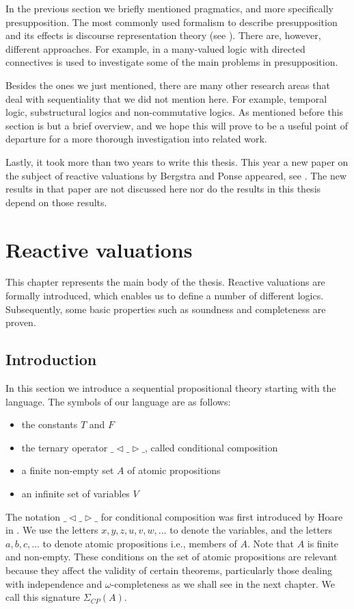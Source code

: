 \documentclass[a4paper,twoside,openright]{report}
\newcommand{\sig}{\ensuremath{\Sigma_{CP}(A)}}
\newcommand{\lef}{\ensuremath{\triangleleft}}
\newcommand{\rig}{\ensuremath{\triangleright}}
\begin{document}
In the previous section we briefly mentioned pragmatics, and more specifically presupposition. The most commonly used formalism to describe presupposition and its effects is discourse representation theory (see \cite{DHT}). There are, however, different approaches. For example, in \cite{kracht} a many-valued logic with directed connectives is used to investigate some of the main problems in presupposition.

Besides the ones we just mentioned, there are many other research areas that deal with sequentiality that we did not mention here. For example, temporal logic, substructural logics and non-commutative logics. As mentioned before this section is but a brief overview, and we hope this will prove to be a useful point of departure for a more thorough investigation into related work.

Lastly, it took more than two years to write this thesis. This year a new paper on the subject of reactive valuations by Bergstra and Ponse appeared, see \cite{future}. The new results in that paper are not discussed here nor do the results in this thesis depend on those results.



\chapter{Reactive valuations}

This chapter represents the main body of the thesis. Reactive valuations are formally introduced, which enables us to define a number of different logics. Subsequently, some basic properties such as soundness and completeness are proven. 

\section{Introduction}
In this section we introduce a sequential propositional theory starting with the language. The symbols of our language are as follows:
\begin{itemize}
\item the constants $T$ and $F$
\item the ternary operator $\_\lef\_\rig\_$, called conditional composition
\item a finite non-empty set $A$ of atomic propositions
\item an infinite set of variables $V$
\end{itemize}
The notation $\_\lef\_\rig\_$ for conditional composition was first introduced by Hoare in \cite{hoare}. We use the letters $x, y, z, u, v, w, \ldots$ to denote the variables, and the letters $a, b, c,\ldots$ to denote atomic propositions i.e., members of $A$.  Note that $A$ is finite and non-empty. These conditions on the set of atomic propositions are relevant because they affect the validity of certain theorems, particularly those dealing with independence and $\omega$-completeness as we shall see in the next chapter. We call this signature $\sig$.
\end{document}
